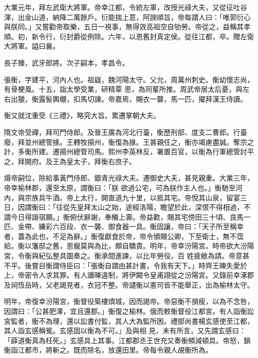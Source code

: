 \begin{pinyinscope}
 大業元年，拜左武衛大將軍。帝幸江都，令統左軍，改授光祿大夫，又從征吐谷渾，出金山道，納降二萬餘戶。衍能揣上意，阿諛順旨，帝每謂人曰：「唯郭衍心與朕同。」又嘗勸帝取樂，五日一視事，無得效高祖空自劬勞。帝從之，益稱其孝順。初，新令行，衍封爵從例除。六年，以恩舊封真定侯。從往江都，卒。贈左衛大將軍。謚曰襄。



 長子臻，武牙郎將。次子嗣本，孝昌令。



 張衡，字建平，河內人也。祖嶷，魏河陽太守。父允，周萬州刺史。衡幼懷志尚，有骨梗風。十五，詣太學受業，研精覃
 思，為同輩所推。周武帝居太后憂，與左右出獵，衡露髻輿櫬，扣馬切諫。帝嘉焉，賜衣一襲，馬一匹，擢拜漢王侍讀。



 衡又就沈重受《三禮》，略究大旨。累遷掌朝大夫。



 隋文帝受禪，拜司門侍郎。及晉王廣為河北行臺，衡歷刑部、度支二曹郎。行臺廢，拜並州總管掾。王轉牧揚州，衡復為掾。王甚親任之，衡亦竭慮盡誠。奪宗之計，多衡所建。遷揚州總管司馬。熙州李英林反，署置百官，以衡為行軍總管討平之，拜開府。及王為皇太子，拜衡右庶子。



 煬帝嗣位，除給事黃門侍郎、銀青光祿大夫。遷御史大夫，甚見親重。大業三年，帝幸榆林郡，還至太原，謂衡曰：「朕
 欲過公宅，可為朕作主人也。」衡馳至河內，與宗族具牛酒。帝上太行，開直道九十里，以抵其宅。帝悅其山泉，留宴三日，因謂衡曰：「往從先皇拜太山之始，途經洛陽，瞻望於此，深恨不得相過，不謂今日得諧宿願。」衡俯伏辭謝，奉觴上壽。帝益歡，賜其宅傍田三十頃、良馬一匹、金帶、縑彩六百段、衣一襲、御食器一具。衡固讓，帝曰：「天子所至稱幸者，蓋為此也，不足為辭。」衡復獻食於帝，帝令頒賜公卿，下至衛士，無不霑給。衡以籓邸之舊，恩寵莫與為比，頗自驕貴。明年，帝幸汾陽宮。時帝欲大汾陽宮，令衡與紀弘整具圖奏之。衡承間進諫，以比年勞役，百
 姓疲敝為請。帝意甚不平。後嘗目衡謂侍臣曰：「張衡自謂由甚計畫，令我有天下。」時齊王暕失愛於上，帝密令人求其罪。有人譖暕違制，將伊闕令皇甫詡從之汾陽宮。又錄前幸涿郡及祠恆岳時，父老謁見者，衣冠不整。帝譴衡以憲司皆不能舉正，出為榆林太守。



 明年，帝復幸汾陽宮，衡督役築樓煩城，因而謁帝。帝惡衡不損瘦，以為不念咎，因謂曰：「公甚肥澤，宜且還郡。」衡復之榆林。俄而敕衡督役江都宮。有人詣衡訟宮監者，衡不為理，還以訟書付監，其人大為監所困。禮部尚書楊玄感使至江都，其人詣玄感稱冤。玄感固以衡為不可。」及與相
 見，未有所言，又先謂玄感曰：「薛道衡真為枉死。」玄感具上其事。江都郡丞王世充又奏衡頻減頓具。帝怒，鎖衡詣江都市，將斬之。既而除名，放還田里。帝每令親人覘衡所為。




\end{pinyinscope}
